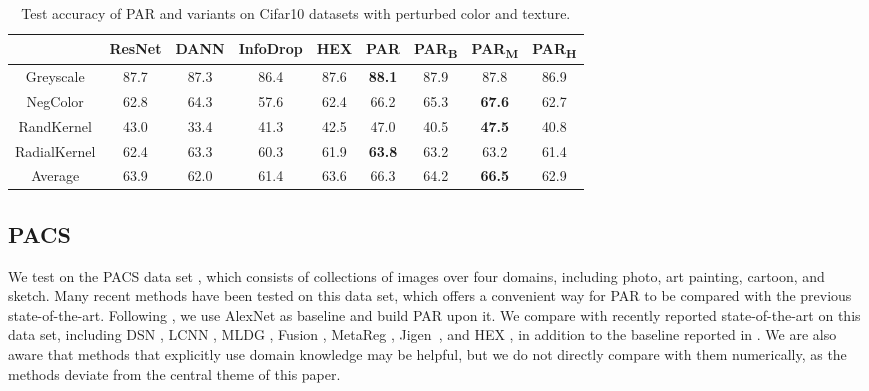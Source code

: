 \documentclass{article}
\begin{document}
\begin{table}[t]
\caption{Test accuracy of PAR and variants on Cifar10 datasets with perturbed color and texture.\break \tiny}
\label{tab:cifar10}
\centering
\begin{tabular}{ccccccccc}
\hline
 & ResNet & DANN & InfoDrop & HEX & PAR & PAR\textsubscript{B} & PAR\textsubscript{M} & PAR\textsubscript{H} \\ \hline
Greyscale & 87.7 & 87.3 & 86.4 & 87.6 & \textbf{88.1} & 87.9 & 87.8 & 86.9 \\
NegColor & 62.8 & 64.3 & 57.6 & 62.4 & 66.2 & 65.3 & \textbf{67.6} & 62.7 \\
RandKernel & 43.0 & 33.4 & 41.3 & 42.5 & 47.0 & 40.5 & \textbf{47.5} & 40.8 \\
RadialKernel & 62.4 & 63.3 & 60.3 & 61.9 & \textbf{63.8} & 63.2 & 63.2 & 61.4 \\ \hline
Average & 63.9 & 62.0 & 61.4 & 63.6 & 66.3 & 64.2 & \textbf{66.5} & 62.9 \\ \hline
\end{tabular}
\end{table}



\subsection{PACS}
We test on the PACS data set \citep{li2017deeper}, which consists of collections of images 
over four domains, including photo, art painting, cartoon, and sketch. Many recent methods have been tested on this data set, which offers a convenient way for PAR to be compared with the previous state-of-the-art. 
Following \citet{li2017deeper}, we use AlexNet as baseline and build PAR upon it. We compare with recently reported state-of-the-art on this data set, including DSN \citep{bousmalis2016domain}, LCNN \citep{li2017deeper}, MLDG \citep{li2017learning}, Fusion \citep{mancini2018best}, MetaReg \citep{NIPS2018_7378}, Jigen~\citep{Carlucci_2019_CVPR}, and HEX \citep{wang2018learning}, in addition to the baseline reported in \citep{li2017deeper}. 
We are also aware that methods that explicitly use domain knowledge \citep[\textit{e.g.},][]{lee2018simple} may be helpful, but we do not directly compare with them numerically, as the methods deviate from the central theme of this paper. 
\end{document}
